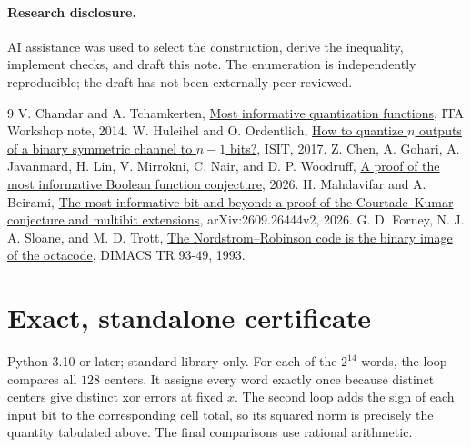 \documentclass[11pt]{article}
\begin{document}
\paragraph{Research disclosure.} AI assistance was used to select the construction, derive the inequality, implement checks, and draft this note. The enumeration is independently reproducible; the draft has not been externally peer reviewed.

\begin{thebibliography}{9}\small
{} V. Chandar and A. Tchamkerten, \href{https://perso.telecom-paristech.fr/tchamker/CTAT.pdf}{Most informative quantization functions}, ITA Workshop note, 2014.
 W. Huleihel and O. Ordentlich, \href{https://arxiv.org/abs/1701.03119}{How to quantize $n$ outputs of a binary symmetric channel to $n-1$ bits?}, ISIT, 2017.
 Z. Chen, A. Gohari, A. Javanmard, H. Lin, V. Mirrokni, C. Nair, and D. P. Woodruff, \href{https://arxiv.org/abs/2609.24931}{A proof of the most informative Boolean function conjecture}, 2026.
 H. Mahdavifar and A. Beirami, \href{https://arxiv.org/abs/2609.26444v2}{The most informative bit and beyond: a proof of the Courtade--Kumar conjecture and multibit extensions}, arXiv:2609.26444v2, 2026.
 G. D. Forney, N. J. A. Sloane, and M. D. Trott, \href{https://archive.dimacs.rutgers.edu/TechnicalReports/abstracts/1993/93-49.html}{The Nordstrom--Robinson code is the binary image of the octacode}, DIMACS TR 93-49, 1993.
\end{thebibliography}
\clearpage
\appendix
\section{Exact, standalone certificate}
Python 3.10 or later; standard library only. For each of the $2^{14}$ words, the loop compares all $128$ centers. It assigns every word exactly once because distinct centers give distinct xor errors at fixed $x$. The second loop adds the sign of each input bit to the corresponding cell total, so its squared norm is precisely the quantity tabulated above. The final comparisons use rational arithmetic.

\clearpage
\end{document}
